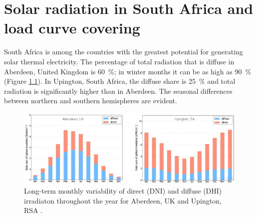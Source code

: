 \chapter{Solar radiation in South Africa and load curve covering}\label{Solar power in South Africa}
South Africa is among the countries with the greatest potential for generating solar thermal electricity. The percentage of total radiation that is diffuse in Aberdeen, United Kingdom is \SI{60}{\percent}; in winter months it can be as high as \SI{90}{\percent} (Figure \ref{DHI-DIF}). In Upington, South Africa, the diffuse share is \SI{25}{\percent} and total radiation is significantly higher than in Aberdeen. The seasonal differences between northern and southern hemispheres are evident.

\begin{figure}[h!] %
\centering
\includegraphics[width=1\linewidth]{FIG/DHI-DIF}
\caption[Long-term monthly variability of direct (DNI) and diffuse (DHI) irradiaton throughout the year for Aberdeen, UK and Upington, RSA.]{Long-term monthly variability of direct (DNI) and diffuse (DHI) irradiaton throughout the year for Aberdeen, UK and Upington, RSA \cite{SolarGIS2015}.}\label{DHI-DIF}
\end{figure} 
